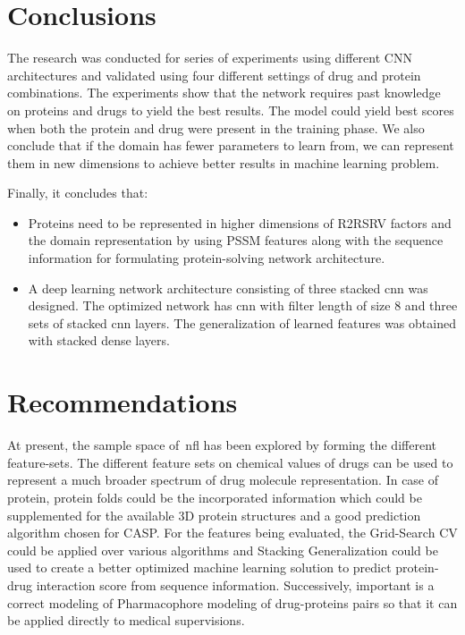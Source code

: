 \chapter{Conclusions}

The research was conducted for series of experiments using different CNN architectures and validated using four different settings of drug and protein combinations. The experiments show that the network requires past knowledge on proteins and drugs to yield the best results. The model could yield best scores when both the protein and drug were present in the training phase. We also conclude that if the domain has fewer parameters to learn from, we can represent them in new dimensions to achieve better results in machine learning problem.

Finally, it concludes that:
\begin{itemize}
    \item Proteins need to be represented in higher dimensions of R2RSRV factors and the domain representation by using PSSM features along with the sequence information for formulating protein-solving network architecture.
    \item A deep learning network architecture consisting of three stacked \acrfull{cnn} was designed. The optimized network has \acrshort{cnn} with filter length of size 8 and three sets of stacked \acrshort{cnn} layers. The generalization of learned features was obtained with stacked dense layers.
\end{itemize}

\chapter{Recommendations}

At present, the sample space of~\acrfull{nfl} has been explored by forming the different feature-sets. The different feature sets on chemical values of drugs can be used to represent a much broader spectrum of drug molecule representation. In case of protein, protein folds could be the incorporated information which could be supplemented for the available 3D protein structures and a good prediction algorithm chosen for CASP\citep{CASP82008}. For the features being evaluated, the Grid-Search CV could be applied over various algorithms and Stacking Generalization could be used to create a better optimized machine learning solution to predict protein-drug interaction score from sequence information. Successively, important is a correct modeling of Pharmacophore modeling of drug-proteins pairs so that it can be applied directly to medical supervisions. 

